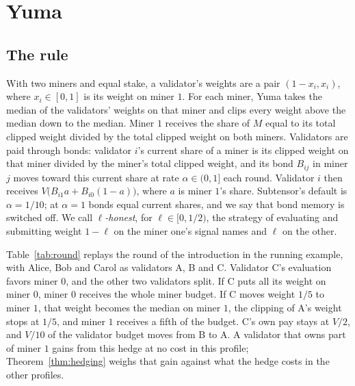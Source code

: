 \documentclass[sigconf,anonymous,review]{acmart}
\numberwithin{equation}{section}
\begin{document}
\section{Yuma}
\label{sec:yuma}

\subsection{The rule}

With two miners and equal stake, a validator's weights are a pair
$(1-x_i,x_i)$, where $x_i\in[0,1]$ is its weight on miner $1$. For each miner,
Yuma takes the median of the validators' weights on that miner and clips every
weight above the median down to the median. Miner $1$ receives the share of $M$
equal to its total clipped weight divided by the total clipped weight on both
miners. Validators are paid through bonds: validator $i$'s current share of a
miner is its clipped weight on that miner divided by the miner's total clipped
weight, and its bond $B_{ij}$ in miner $j$ moves toward this current share at
rate $\alpha\in(0,1]$ each round. Validator $i$ then receives
$V\bigl(B_{i1}a+B_{i0}(1-a)\bigr)$, where $a$ is miner $1$'s share. Subtensor's
default is $\alpha=1/10$; at $\alpha=1$ bonds equal current shares, and we say
that bond memory is switched off. We call \emph{$\ell$-honest}, for
$\ell\in[0,1/2)$, the strategy of evaluating and submitting weight $1-\ell$ on
the miner one's signal names and $\ell$ on the other.

Table~\ref{tab:round} replays the round of the introduction in the running
example, with Alice, Bob and Carol as validators A, B and C.
Validator C's evaluation favors miner $0$, and the other two validators split.
If C puts all its weight on miner $0$, miner $0$ receives the whole miner
budget. If C moves weight $1/5$ to miner $1$, that weight becomes the median on
miner $1$, the clipping of A's weight stops at $1/5$, and miner $1$ receives a
fifth of the budget. C's own pay stays at $V/2$, and $V/10$ of the validator
budget moves from B to A. A validator that owns part of miner $1$ gains from
this hedge at no cost in this profile; Theorem~\ref{thm:hedging} weighs that
gain against what the hedge costs in the other profiles.
\end{document}
